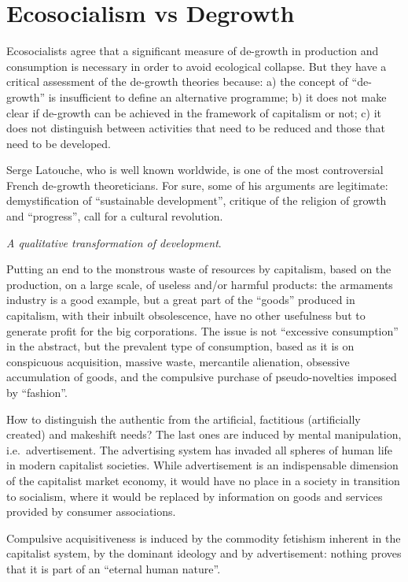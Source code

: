 \documentclass[
]{book}
\begin{document}
\hypertarget{ecosocialism-vs-degrowth}{%
\section{Ecosocialism vs Degrowth}\label{ecosocialism-vs-degrowth}}

Ecosocialists agree that a significant measure of de-growth in production and consumption is necessary in order to avoid ecological collapse. But they have a critical assessment of the de-growth theories because: a) the concept of ``de-growth'' is insufficient to define an alternative programme; b) it does not make clear if de-growth can be achieved in the framework of capitalism or not; c) it does not distinguish between activities that need to be reduced and those that need to be developed.

Serge Latouche, who is well known worldwide, is one of the most controversial French de-growth theoreticians. For sure, some of his arguments are legitimate: demystification of ``sustainable development'', critique of the religion of growth and ``progress'', call for a cultural revolution.

\emph{A qualitative transformation of development}.

Putting an end to the monstrous waste of resources by capitalism, based on the production, on a large scale, of useless and/or harmful products: the armaments industry is a good example, but a great part of the ``goods'' produced in capitalism, with their inbuilt obsolescence, have no other usefulness but to generate profit for the big corporations. The issue is not ``excessive consumption'' in the abstract, but the prevalent type of consumption, based as it is on conspicuous acquisition, massive waste, mercantile alienation, obsessive accumulation of goods, and the compulsive purchase of pseudo-novelties imposed by ``fashion''.

How to distinguish the authentic from the artificial, factitious (artificially created) and makeshift needs? The last ones are induced by mental manipulation, i.e.~advertisement. The advertising system has invaded all spheres of human life in modern capitalist societies.
While advertisement is an indispensable dimension of the capitalist market economy, it would have no place in a society in transition to socialism, where it would be replaced by information on goods and services provided by consumer associations.

Compulsive acquisitiveness is induced by the commodity fetishism inherent in the capitalist system, by the dominant ideology and by advertisement: nothing proves that it is part of an ``eternal human nature''.
\end{document}
